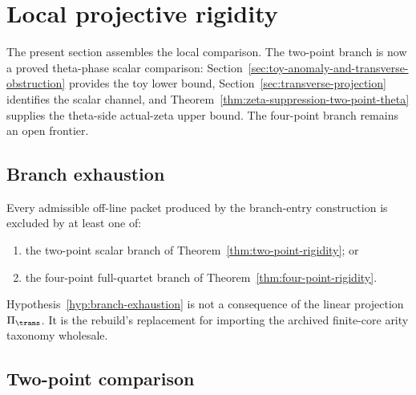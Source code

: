 \section{Local projective rigidity}
\label{sec:projective-rigidity}
\quad
{}\quad
{}\quad
{}\quad
{}\quad
{}
\par\medskip

The present section assembles the local comparison.  The two-point branch is
now a proved theta-phase scalar comparison: Section~\ref{sec:toy-anomaly-and-transverse-obstruction}
provides the toy lower bound, Section~\ref{sec:transverse-projection}
identifies the scalar channel, and
Theorem~\ref{thm:zeta-suppression-two-point-theta} supplies the theta-side
actual-zeta upper bound.  The four-point branch remains an open frontier.

\subsection{Branch exhaustion}
\label{subsec:branch-exhaustion}

\begin{hypothesis}
\label{hyp:branch-exhaustion}
Every admissible off-line packet produced by the branch-entry construction
is excluded by at least one of:
\begin{enumerate}[label=\textup{(\roman*)},leftmargin=*]
\item the two-point scalar branch of Theorem~\ref{thm:two-point-rigidity}; or
\item the four-point full-quartet branch of Theorem~\ref{thm:four-point-rigidity}.
\end{enumerate}
\end{hypothesis}

\begin{remark}
\label{rem:branch-exhaustion-status}
Hypothesis~\ref{hyp:branch-exhaustion} is not a consequence of the
linear projection \(\Pi_\trans\).  It is the rebuild's replacement for
importing the archived finite-core arity taxonomy wholesale.
\end{remark}

\subsection{Two-point comparison}
\label{subsec:two-point-comparison}

